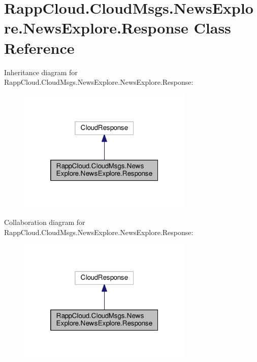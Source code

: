 \hypertarget{classRappCloud_1_1CloudMsgs_1_1NewsExplore_1_1NewsExplore_1_1Response}{\section{Rapp\-Cloud.\-Cloud\-Msgs.\-News\-Explore.\-News\-Explore.\-Response Class Reference}
\label{classRappCloud_1_1CloudMsgs_1_1NewsExplore_1_1NewsExplore_1_1Response}
}


Inheritance diagram for Rapp\-Cloud.\-Cloud\-Msgs.\-News\-Explore.\-News\-Explore.\-Response\-:
\nopagebreak
\begin{figure}[H]
\begin{center}
\leavevmode
\includegraphics[width=236pt]{classRappCloud_1_1CloudMsgs_1_1NewsExplore_1_1NewsExplore_1_1Response__inherit__graph}
\end{center}
\end{figure}


Collaboration diagram for Rapp\-Cloud.\-Cloud\-Msgs.\-News\-Explore.\-News\-Explore.\-Response\-:
\nopagebreak
\begin{figure}[H]
\begin{center}
\leavevmode
\includegraphics[width=236pt]{classRappCloud_1_1CloudMsgs_1_1NewsExplore_1_1NewsExplore_1_1Response__coll__graph}
\end{center}
\end{figure}
